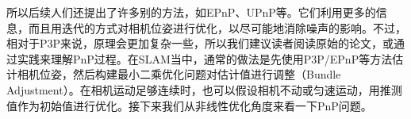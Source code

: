 所以后续人们还提出了许多别的方法，如EPnP、UPnP等。它们利用更多的信息，而且用迭代的方式对相机位姿进行优化，以尽可能地消除噪声的影响。不过，相对于P3P来说，原理会更加复杂一些，所以我们建议读者阅读原始的论文，或通过实践来理解PnP过程。在SLAM当中，通常的做法是先使用P3P/EPnP等方法估计相机位姿，然后构建最小二乘优化问题对估计值进行调整（Bundle Adjustment）。在相机运动足够连续时，也可以假设相机不动或匀速运动，用推测值作为初始值进行优化。接下来我们从非线性优化角度来看一下PnP问题。

%
%
%
%
%
%
%


